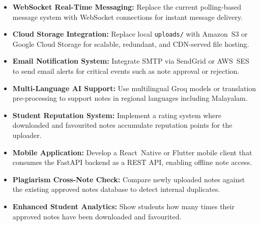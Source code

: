 \documentclass{sgcproject}
\begin{document}
\begin{itemize}
    \item \textbf{WebSocket Real-Time Messaging:} Replace the current polling-based message system with WebSocket connections for instant message delivery.
    \item \textbf{Cloud Storage Integration:} Replace local \texttt{uploads/} with Amazon~S3 or Google Cloud Storage for scalable, redundant, and CDN-served file hosting.
    \item \textbf{Email Notification System:} Integrate SMTP via SendGrid or AWS~SES to send email alerts for critical events such as note approval or rejection.
    \item \textbf{Multi-Language AI Support:} Use multilingual Groq models or translation pre-processing to support notes in regional languages including Malayalam.
    \item \textbf{Student Reputation System:} Implement a rating system where downloaded and favourited notes accumulate reputation points for the uploader.
    \item \textbf{Mobile Application:} Develop a React~Native or Flutter mobile client that consumes the FastAPI backend as a REST API, enabling offline note access.
    \item \textbf{Plagiarism Cross-Note Check:} Compare newly uploaded notes against the existing approved notes database to detect internal duplicates.
    \item \textbf{Enhanced Student Analytics:} Show students how many times their approved notes have been downloaded and favourited.
\end{itemize}
\end{document}

